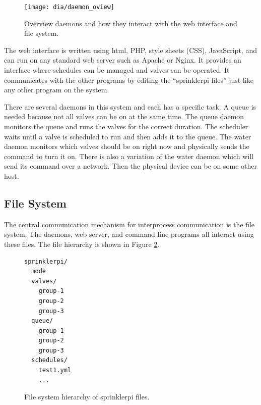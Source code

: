 \documentclass{article}
\begin{document}
\begin{figure}
\begin{center}
\texttt{[image: dia/daemon\_oview]}
\end{center}
\caption{Overview daemons and how they interact with the web interface
and file system.}
\label{fig:dov}
\end{figure}

The web interface is written using html, PHP, style sheets (CSS), JavaScript,
and can run on any standard web server such as Apache or Nginx.
It provides an interface where schedules can be managed and valves can
be operated.
It communicates with the other programs by editing the ``sprinklerpi files''
just like any other program on the system.

There are several daemons in this system and each has a specific task.
A queue is needed because not all valves can be on at the same time.
The queue daemon monitors the queue and runs the valves for the correct
duration.
The scheduler waits until a valve is scheduled to run and then adds it
to the queue.
The water daemon monitors which valves should be on right now and physically
sends the command to turn it on.
There is also a variation of the water daemon which will send its command
over a network.
Then the physical device can be on some other host.

\FloatBarrier
\subsection{File System}

The central communication mechanism for interprocess communication
is the file system.  The daemons, web server, and command line programs
all interact using these files.
The file hierarchy is shown in Figure \ref{fig:fs}.

\begin{figure}[h!]

\begin{center}
\begin{minipage}{3in}
\begin{verbatim}
sprinklerpi/
  mode
  valves/
    group-1
    group-2
    group-3
  queue/
    group-1
    group-2
    group-3
  schedules/
    test1.yml
    ...
\end{verbatim}
\end{minipage}
\end{center}
\caption{File system hierarchy of sprinklerpi files.}
\label{fig:fs}
\end{figure}
\end{document}
